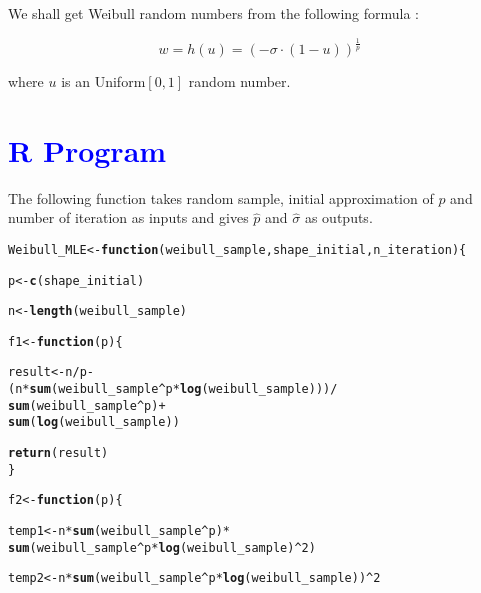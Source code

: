 \documentclass[11pt, a4paper]{article}\usepackage[]{graphicx}\usepackage[]{xcolor}
\makeatletter
\newcommand{\hlnum}[1]{\textcolor[rgb]{0.686,0.059,0.569}{#1}}%
\newcommand{\hlopt}[1]{\textcolor[rgb]{0,0,0}{#1}}%
\newcommand{\hldef}[1]{\textcolor[rgb]{0.345,0.345,0.345}{#1}}%
\newcommand{\hlkwa}[1]{\textcolor[rgb]{0.161,0.373,0.58}{\textbf{#1}}}%
\newcommand{\hlkwb}[1]{\textcolor[rgb]{0.69,0.353,0.396}{#1}}%
\newcommand{\hlkwc}[1]{\textcolor[rgb]{0.333,0.667,0.333}{#1}}%
\newcommand{\hlkwd}[1]{\textcolor[rgb]{0.737,0.353,0.396}{\textbf{#1}}}%
\newenvironment{kframe}{%
 \def\at@end@of@kframe{}%
 \ifinner\ifhmode%
  \def\at@end@of@kframe{\end{minipage}}%
  \begin{minipage}{\columnwidth}%
 \fi\fi%
 \def\FrameCommand##1{\hskip\@totalleftmargin \hskip-\fboxsep
 \colorbox{shadecolor}{##1}\hskip-\fboxsep
     \hskip-\linewidth \hskip-\@totalleftmargin \hskip\columnwidth}%
 \MakeFramed {\advance\hsize-\width
   \@totalleftmargin\z@ \linewidth\hsize
   \@setminipage}}%
 {\par\unskip\endMakeFramed%
 \at@end@of@kframe}
\newenvironment{knitrout}{}{} %
\makeatother
\begin{document}
We shall get Weibull random numbers from the following formula :

$$w = h(u) = (-\sigma \cdot (1 - u))^\frac{1}{p}$$

where $u$ is an Uniform$[0, 1]$ random number.


\section*{\faArrowAltCircleRight[regular] \textcolor{blue}{R Program}}

The following function takes random sample, initial approximation of $p$ and number of iteration as inputs and gives $\hat{p}$ and $\hat{\sigma}$ as outputs.

\begin{knitrout}
\color{fgcolor}\begin{kframe}
\begin{alltt}
\hldef{Weibull_MLE} \hlkwb{<-} \hlkwa{function}\hldef{(}\hlkwc{weibull_sample}\hldef{,} \hlkwc{shape_initial}\hldef{,} \hlkwc{n_iteration}\hldef{)\{}

  \hldef{p} \hlkwb{<-} \hlkwd{c}\hldef{(shape_initial)}

  \hldef{n} \hlkwb{<-} \hlkwd{length}\hldef{(weibull_sample)}

  \hldef{f1} \hlkwb{<-} \hlkwa{function}\hldef{(}\hlkwc{p}\hldef{)\{}

    \hldef{result} \hlkwb{<-} \hldef{n} \hlopt{/} \hldef{p} \hlopt{-}
              \hldef{( n} \hlopt{*} \hlkwd{sum}\hldef{(weibull_sample}\hlopt{^}\hldef{p} \hlopt{*} \hlkwd{log}\hldef{(weibull_sample)) )} \hlopt{/}
                        \hlkwd{sum}\hldef{(weibull_sample}\hlopt{^}\hldef{p)} \hlopt{+}
              \hlkwd{sum}\hldef{(}\hlkwd{log}\hldef{(weibull_sample))}

    \hlkwd{return}\hldef{(result)}
  \hldef{\}}

  \hldef{f2} \hlkwb{<-} \hlkwa{function}\hldef{(}\hlkwc{p}\hldef{)\{}

    \hldef{temp1} \hlkwb{<-} \hldef{n} \hlopt{*} \hlkwd{sum}\hldef{(weibull_sample}\hlopt{^}\hldef{p)} \hlopt{*}
                 \hlkwd{sum}\hldef{(weibull_sample}\hlopt{^}\hldef{p} \hlopt{*} \hlkwd{log}\hldef{(weibull_sample)}\hlopt{^}\hlnum{2}\hldef{)}

    \hldef{temp2} \hlkwb{<-} \hldef{n} \hlopt{*} \hlkwd{sum}\hldef{(weibull_sample}\hlopt{^}\hldef{p} \hlopt{*} \hlkwd{log}\hldef{(weibull_sample))}\hlopt{^}\hlnum{2}


\end{alltt}
\end{kframe}
\end{knitrout}
\end{document}
